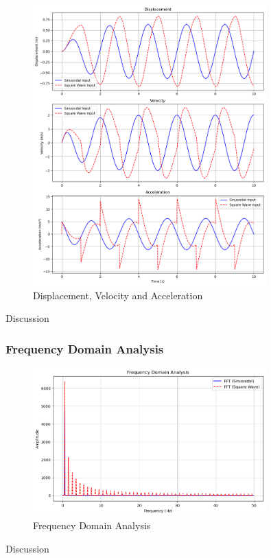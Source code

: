 \documentclass[12pt,a4paper]{article}
\begin{document}
\begin{figure}[H]
    \centering
    \includegraphics[width=0.8\textwidth]{disp_vel_acc.png  } 
    \caption{Displacement, Velocity and Acceleration }
    \label{fig:system}
\end{figure}
{\vspace{10pt}}
Discussion
{\vspace{10pt}}

\subsubsection{Frequency Domain Analysis}
\begin{figure}[H]
    \centering
    \includegraphics[width=0.8\textwidth]{freq_domain.png} 
    \caption{Frequency Domain Analysis}
    \label{fig:system}
\end{figure}
{\vspace{10pt}}
Discussion
{\vspace{10pt}}
\end{document}
